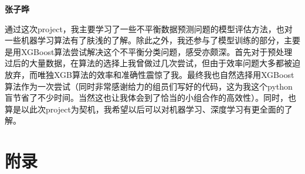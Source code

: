 \documentclass[a4paper,12pt]{article}
\begin{document}
\par

\textbf{张子晔}

通过这次project，我主要学习了一些不平衡数据预测问题的模型评估方法，也对一些机器学习算法有了肤浅的了解。除此之外，我还参与了模型训练的部分，主要是用XGBoost算法尝试解决这个不平衡分类问题，感受亦颇深。首先对于预处理过后的大量数据，在算法的选择上我曾做过几次尝试，但由于效率问题大多都被迫放弃，而唯独XGB算法的效率和准确性震惊了我。最终我也自然选择用XGBoost算法作为一次尝试（同时非常感谢给力的组员们写好的代码，这为我这个python盲节省了不少时间。当然这也让我体会到了恰当的小组合作的高效性）。同时，也算是以此次project为契机，我希望以后可以对机器学习、深度学习有更全面的了解。
\newpage
\section{附录}
\end{document}
